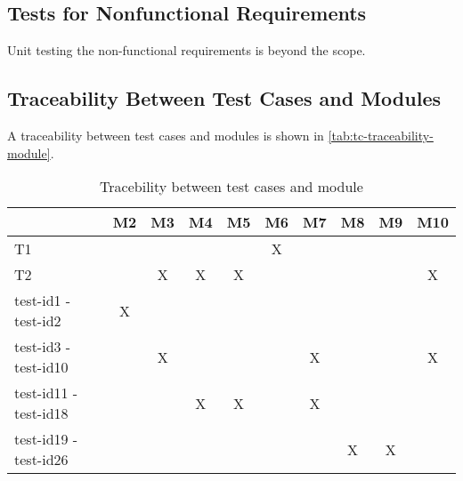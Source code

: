 \documentclass[12pt, titlepage]{article}
\begin{document}
\subsection{Tests for Nonfunctional Requirements}

Unit testing the non-functional requirements is beyond the scope.

\subsection{Traceability Between Test Cases and Modules}

A traceability between test cases and modules is shown in \autoref{tab:tc-traceability-module}.

\begin{table}[h!]
\begin{center}
\begin{tabular}{ l|c|c|c|c|c|c|c|c|c }
\hline
 & M2 & M3 & M4 & M5 & M6 & M7 & M8 & M9 & M10\\
\hline
T1 & & & & & X & & & &\\
\hline
T2 & & X & X & X & & & & & X\\
\hline
test-id1 - test-id2 & X & & & & & & & &\\
\hline
test-id3 - test-id10 & & X & & & & X & & & X\\
\hline
test-id11 - test-id18 & & & X & X & & X & & &\\
\hline
test-id19 - test-id26 & & & & & & & X & X &\\

\hline
\end{tabular}
\caption{Tracebility between test cases and module}
\label{tab:tc-traceability-module}
\end{center}
\end{table}
				




\newpage



\end{document}
